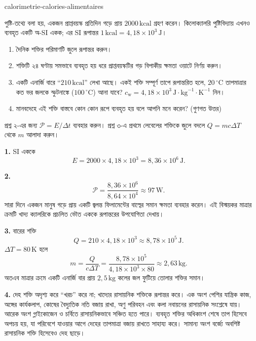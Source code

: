 \begin{exo}[খাদ্য ক্যালরি ও বিপাকীয় ক্ষমতা]{calorimetrie-calories-alimentaires}

পুষ্টি-তথ্যে বলা হয়, একজন প্রাপ্তবয়স্ক প্রতিদিন গড়ে প্রায় $2000\,\text{kcal}$ গ্রহণ করেন। কিলোক্যালরি পুষ্টিবিদ্যায় এখনও ব্যবহৃত একটি অ-SI একক; এর SI রূপান্তর $1\,\text{kcal}=4{,}18\times10^3\,\text{J}$।

\begin{enumerate}
  \item দৈনিক শক্তির পরিমাণটি জুলে রূপান্তর করুন।
  \item শক্তিটি ২৪ ঘণ্টায় সমভাবে ব্যবহৃত হয় ধরে প্রাপ্তবয়স্কটির গড় বিপাকীয় ক্ষমতা ওয়াটে নির্ণয় করুন।
  \item একটি এনার্জি বারে ``$210\,\text{kcal}$'' লেখা আছে। একই শক্তি সম্পূর্ণ তাপে রূপান্তরিত হলে, $20\,{}^\circ\text{C}$ তাপমাত্রার কত ভর জলকে স্ফুটনাঙ্কে ($100\,{}^\circ\text{C}$) আনা যাবে? $c_{\mathrm{w}}=4{,}18\times10^3\,\text{J}\!\cdot\!\text{kg}^{-1}\!\cdot\!\text{K}^{-1}$ নিন।
  \item মানবদেহে এই শক্তি বাস্তবে কোন কোন রূপে ব্যবহৃত হয় বলে আপনি মনে করেন? (গুণগত উত্তর)
\end{enumerate}

\begin{indication}
প্রশ্ন ২-এর জন্য $\mathcal P=E/\Delta t$ ব্যবহার করুন। প্রশ্ন ৩-এ প্রথমে লেবেলের শক্তিকে জুলে বদলে $Q=mc\Delta T$ থেকে $m$ আলাদা করুন।
\end{indication}

\begin{solution}
\textbf{1.} SI এককে
\[
E=2000\times4{,}18\times10^3=8{,}36\times10^6\,\text{J}.
\]

\textbf{2.}
\[
\mathcal P=\frac{8{,}36\times10^6}{8{,}64\times10^4}\approx97\,\text{W}.
\]
সারা দিনে একজন মানুষ গড়ে প্রায় একটি জ্বলন্ত ফিলামেন্টের বাল্বের সমান ক্ষমতা ব্যবহার করেন। এই বিস্ময়কর মাত্রার ক্রমটি খাদ্য ক্যালরিকে প্রচলিত ভৌত এককে রূপান্তরের উপযোগিতা দেখায়।

\textbf{3.} বারের শক্তি
\[
Q=210\times4{,}18\times10^3\approx8{,}78\times10^5\,\text{J}.
\]
$\Delta T=80\,\text{K}$ হলে
\[
m=\frac{Q}{c\Delta T}
=\frac{8{,}78\times10^5}{4{,}18\times10^3\times80}
\approx2{,}63\,\text{kg}.
\]
অতএব মাত্রার ক্রমে একটি এনার্জি বার প্রায় $2{,}5\,\text{kg}$ কলের জল ফুটিয়ে তোলার শক্তির সমান।

\textbf{4.} দেহ শক্তি অদৃশ্য করে ``খরচ'' করে না; খাদ্যের রাসায়নিক শক্তিকে রূপান্তর করে। এক অংশ পেশির যান্ত্রিক কাজ, অঙ্গের কার্যকলাপ, কোষের বৈদ্যুতিক নতি বজায় রাখা, অণু পরিবহন এবং কলা নবায়নের রাসায়নিক সংশ্লেষে যায়। আরেক অংশ গ্লাইকোজেন ও চর্বিতে রাসায়নিকভাবে সঞ্চিত হতে পারে। ব্যবহৃত শক্তির অধিকাংশ শেষে তাপ হিসেবে অপচয় হয়, যা পরিবেশে যাওয়ার আগে দেহের তাপমাত্রা বজায় রাখতে সাহায্য করে। সামান্য অংশ বর্জ্যে অবশিষ্ট রাসায়নিক শক্তি হিসেবেও দেহ ছাড়ে।
\end{solution}
\end{exo}
